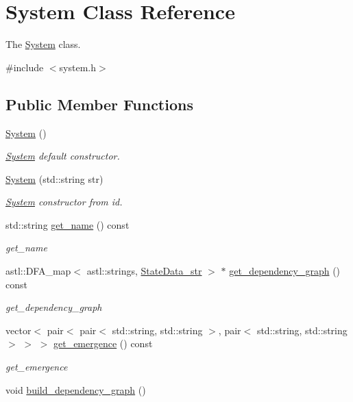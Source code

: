 \hypertarget{class_system}{}\section{System Class Reference}
\label{class_system}


The \hyperlink{class_system}{System} class.  




{\ttfamily \#include $<$system.\+h$>$}

\subsection*{Public Member Functions}
\begin{DoxyCompactItemize}
\item 
\hyperlink{class_system_ae317936c9bcf1374d61745572e0f2f8a}{System} ()\hypertarget{class_system_ae317936c9bcf1374d61745572e0f2f8a}{}\label{class_system_ae317936c9bcf1374d61745572e0f2f8a}

\begin{DoxyCompactList}\small\item\em \hyperlink{class_system}{System} default constructor. \end{DoxyCompactList}\item 
\hyperlink{class_system_a9bada97aaf44e8d1f97af1b4b3cd5b5e}{System} (std\+::string str)
\begin{DoxyCompactList}\small\item\em \hyperlink{class_system}{System} constructor from id. \end{DoxyCompactList}\item 
std\+::string \hyperlink{class_system_ae954855d19dbdf150c3f0d320fd01eb2}{get\+\_\+name} () const 
\begin{DoxyCompactList}\small\item\em get\+\_\+name \end{DoxyCompactList}\item 
astl\+::\+D\+F\+A\+\_\+map$<$ astl\+::strings, \hyperlink{class_state_data__str}{State\+Data\+\_\+str} $>$ $\ast$ \hyperlink{class_system_a6b946a08e7ae3638271086057c52f551}{get\+\_\+dependency\+\_\+graph} () const 
\begin{DoxyCompactList}\small\item\em get\+\_\+dependency\+\_\+graph \end{DoxyCompactList}\item 
vector$<$ pair$<$ pair$<$ std\+::string, std\+::string $>$, pair$<$ std\+::string, std\+::string $>$ $>$ $>$ \hyperlink{class_system_a5f440ce561affd28214f51b8aeebc641}{get\+\_\+emergence} () const 
\begin{DoxyCompactList}\small\item\em get\+\_\+emergence \end{DoxyCompactList}\item 
void \hyperlink{class_system_a8415d22cdbef13af10d7e9cc1624f1a2}{build\+\_\+dependency\+\_\+graph} ()\hypertarget{class_system_a8415d22cdbef13af10d7e9cc1624f1a2}{}\label{class_system_a8415d22cdbef13af10d7e9cc1624f1a2}


\end{DoxyCompactItemize}
